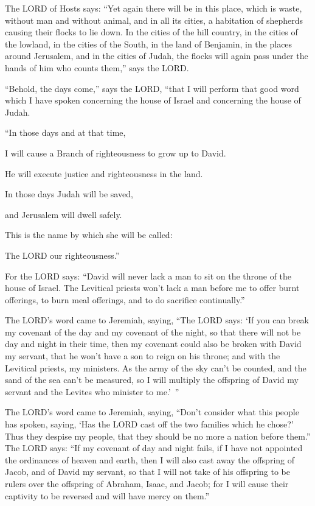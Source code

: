\myverse{}The LORD of Hosts says: “Yet again there will be in this place, which is waste, without man and without animal, and in all its cities, a habitation of shepherds causing their flocks to lie down. \myverse{}In the cities of the hill country, in the cities of the lowland, in the cities of the South, in the land of Benjamin, in the places around Jerusalem, and in the cities of Judah, the flocks will again pass under the hands of him who counts them,” says the LORD.


\myverse{}“Behold, the days come,” says the LORD, “that I will perform that good word which I have spoken concerning the house of Israel and concerning the house of Judah.


\myverse{}“In those days and at that time,

I will cause a Branch of righteousness to grow up to David.

He will execute justice and righteousness in the land.


\myverse{}In those days Judah will be saved,

and Jerusalem will dwell safely.

This is the name by which she will be called:

The LORD our righteousness.”


\myverse{}For the LORD says: “David will never lack a man to sit on the throne of the house of Israel. \myverse{}The Levitical priests won’t lack a man before me to offer burnt offerings, to burn meal offerings, and to do sacrifice continually.”


\myverse{}The LORD’s word came to Jeremiah, saying, \myverse{}“The LORD says: ‘If you can break my covenant of the day and my covenant of the night, so that there will not be day and night in their time, \myverse{}then my covenant could also be broken with David my servant, that he won’t have a son to reign on his throne; and with the Levitical priests, my ministers. \myverse{}As the army of the sky can’t be counted, and the sand of the sea can’t be measured, so I will multiply the offspring of David my servant and the Levites who minister to me.’ ”


\myverse{}The LORD’s word came to Jeremiah, saying, \myverse{}“Don’t consider what this people has spoken, saying, ‘Has the LORD cast off the two families which he chose?’ Thus they despise my people, that they should be no more a nation before them.” \myverse{}The LORD says: “If my covenant of day and night fails, if I have not appointed the ordinances of heaven and earth, \myverse{}then I will also cast away the offspring of Jacob, and of David my servant, so that I will not take of his offspring to be rulers over the offspring of Abraham, Isaac, and Jacob; for I will cause their captivity to be reversed and will have mercy on them.”


